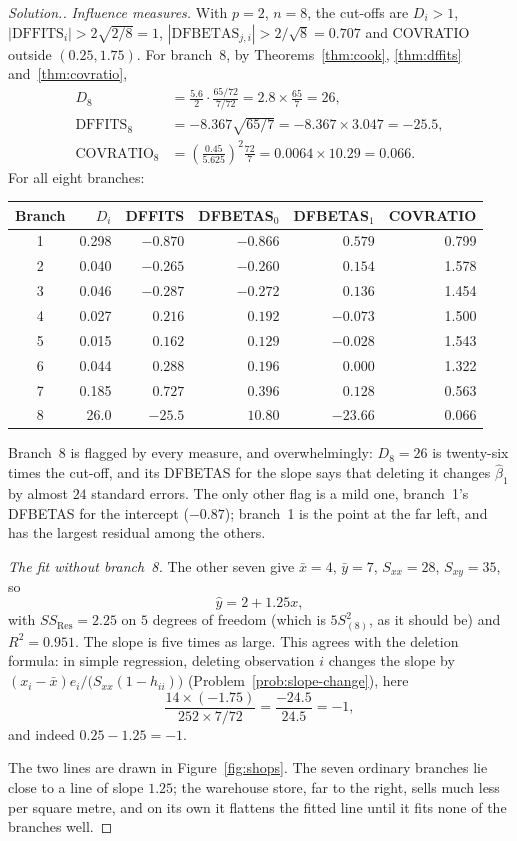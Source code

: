\documentclass[11pt,a4paper]{article}
\numberwithin{equation}{section}
\theoremstyle{definition}
\newenvironment{solution}
  {\renewcommand{\qedsymbol}{}\begin{proof}[\textit{Solution}.]}
  {\end{proof}}
\begin{document}
\begin{solution}
\emph{Influence measures.} With $p = 2$, $n = 8$, the cut-offs are $D_i > 1$,
$|\mathrm{DFFITS}_i| > 2\sqrt{2/8} = 1$, $|\mathrm{DFBETAS}_{j,i}| > 2/\sqrt8 = 0.707$ and
COVRATIO outside $(0.25, 1.75)$. For branch~8, by Theorems~\ref{thm:cook}, \ref{thm:dffits}
and~\ref{thm:covratio},
\begin{align*}
D_8 &= \frac{5.6}{2}\cdot\frac{65/72}{7/72} = 2.8 \times \frac{65}{7} = 26, \\
\mathrm{DFFITS}_8 &= -8.367\sqrt{65/7} = -8.367 \times 3.047 = -25.5, \\
\mathrm{COVRATIO}_8 &= \left(\frac{0.45}{5.625}\right)^2\frac{72}{7} = 0.0064 \times 10.29 = 0.066 .
\end{align*}
For all eight branches:
\begin{center}
\begin{tabular}{c|rrrrr}
Branch & $D_i$ & DFFITS & DFBETAS$_0$ & DFBETAS$_1$ & COVRATIO \\
\hline
1 & 0.298 & $-0.870$ & $-0.866$ & $0.579$ & 0.799 \\
2 & 0.040 & $-0.265$ & $-0.260$ & $0.154$ & 1.578 \\
3 & 0.046 & $-0.287$ & $-0.272$ & $0.136$ & 1.454 \\
4 & 0.027 & $0.216$ & $0.192$ & $-0.073$ & 1.500 \\
5 & 0.015 & $0.162$ & $0.129$ & $-0.028$ & 1.543 \\
6 & 0.044 & $0.288$ & $0.196$ & $0.000$ & 1.322 \\
7 & 0.185 & $0.727$ & $0.396$ & $0.128$ & 0.563 \\
8 & 26.0 & $-25.5$ & $10.80$ & $-23.66$ & 0.066 \\
\end{tabular}
\end{center}
Branch~8 is flagged by every measure, and overwhelmingly: $D_8 = 26$ is twenty-six times the
cut-off, and its DFBETAS for the slope says that deleting it changes $\hat\beta_1$ by almost
$24$ standard errors. The only other flag is a mild one, branch~1's DFBETAS for the intercept
($-0.87$); branch~1 is the point at the far left, and has the largest residual among the
others.

\emph{The fit without branch~8.} The other seven give $\bar x = 4$, $\bar y = 7$,
$S_{xx} = 28$, $S_{xy} = 35$, so
\[
\hat y = 2 + 1.25x ,
\]
with $SS_{\mathrm{Res}} = 2.25$ on $5$ degrees of freedom (which is $5S^2_{(8)}$, as it should be)
and $R^2 = 0.951$. The slope is five times as large. This agrees with the deletion
formula: in simple regression, deleting observation $i$ changes the slope by
$(x_i - \bar x)e_i/\bigl(S_{xx}(1 - h_{ii})\bigr)$ (Problem~\ref{prob:slope-change}), here
\[
\frac{14 \times (-1.75)}{252 \times 7/72} = \frac{-24.5}{24.5} = -1 ,
\]
and indeed $0.25 - 1.25 = -1$.

The two lines are drawn in Figure~\ref{fig:shops}. The seven ordinary branches lie close to
a line of slope $1.25$; the warehouse store, far to the right, sells much less per square
metre, and on its own it flattens the fitted line until it fits none of the branches well.
\end{solution}
\end{document}
